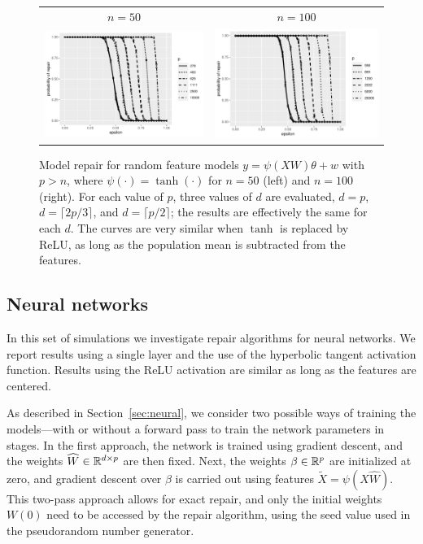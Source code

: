 \begin{figure}[ht]
  \begin{center}
    \begin{tabular}{cc}
      {\scriptsize $n=50$} & {\scriptsize $n=100$} \\
      \includegraphics[width=.47\textwidth]{fig/plot-rf-50} &
      \includegraphics[width=.47\textwidth]{fig/plot-rf-100}\\[-10pt]
    \end{tabular}
  \end{center}
\caption{Model repair for random feature models $y=\psi(XW)\theta + w$ with $p>n$, where $\psi(\cdot) = \tanh(\cdot)$
for $n=50$ (left) and $n=100$ (right). For each value of $p$, three values of $d$ are evaluated, $d=p$, $d=\lceil 2p/3\rceil$,
and $d=\lceil p/2\rceil$; the results are effectively the same for each $d$. The curves are very similar when $\tanh$ is replaced by ReLU, as long as the population mean is subtracted from the features.}
\label{fig:rf}
\end{figure}

\subsection{Neural networks}
\vskip10pt

In this set of simulations we investigate repair algorithms for neural networks. We report results using a single layer and the use of the hyperbolic tangent activation function. Results using the ReLU activation are similar as long as the features are centered.

As described in Section~\ref{sec:neural}, we consider two possible ways of training the models---with or without a forward pass to train the network parameters in stages. In the first approach, the network is trained using gradient descent, and the weights $\widehat W\in\mathbb{R}^{d\times p}$ are then fixed. Next, the weights $\beta\in\mathbb{R}^p$ are initialized at zero, and gradient descent over $\beta$ is carried out using features
$\tilde X = \psi(X\hat W)$. This two-pass approach allows for exact repair, and only the initial weights $W(0)$ need to be accessed by the repair algorithm, using the seed value used in the pseudorandom number generator.

